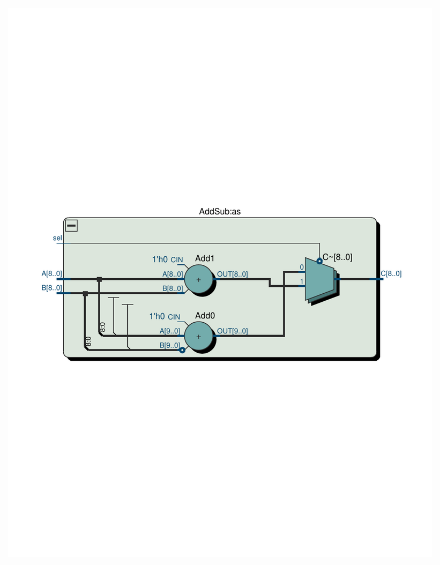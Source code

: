 \documentclass[13pt,a4paper]{report}
\begin{document}
\begin{figure}[H]
{\includegraphics[scale=0.5, clip, trim={0cm 10cm 0cm 10.6cm}]{images/Exc1_AddSub_RTL.pdf}
}
\end{figure}
\end{document}
